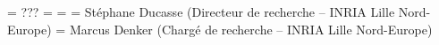 \documentclass[a4paper,12pt,twoside]{../includes/ThesisStyle}
\begin{document}
\fi

\ThesisDate{}
\ThesisLilleI
\President = {???} 
\Rapporteurs = {
} 
\Examinateurs = {
} 
\Directeur = {
St\'ephane Ducasse  \quad   \xspace(Directeur de recherche -- INRIA Lille Nord-Europe)}
\Coencadreur = {
Marcus Denker \quad   \xspace(Charg\'e de recherche -- INRIA Lille Nord-Europe)}

\MakeThesisTitlePage 

\ifx\wholebook\relax\else
    
\end{document}
